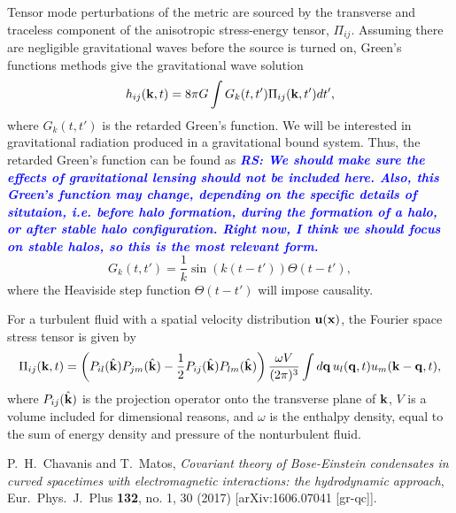 \documentclass[onecolumn,nofootinbib,superscriptaddress]{revtex4}
\newcommand{\rs}[1]{\textcolor{blue}{\it{\textbf{RS: #1}}} }
\begin{document}
{Tensor mode perturbations of the metric are sourced by the transverse and traceless component of the anisotropic stress-energy tensor, $\Pi_{ij}$. Assuming there are negligible gravitational waves before the source is turned on, Green's functions methods give the gravitational wave solution
\begin{equation}
h_{ij}({\bf{k}},t) = 8\pi G\int G_k(t,t')\Pi_{ij}({\bf{k}},t') dt',
\end{equation}
where $G_k(t,t')$ is the retarded Green's function.  We will be interested in gravitational radiation produced in a gravitational bound system.  Thus, the retarded Green's function can be found  as {\rs{We should make sure the effects of gravitational lensing should not be included here.  Also, this Green's function may change, depending on the specific details of situtaion, i.e. before halo formation, during the formation of a halo, or after stable halo configuration.  Right now, I think we should focus on stable halos, so this is the most relevant form.}}
\begin{equation}
G_k(t,t') = \frac{1}{k}\sin\left(k(t-t')\right)\Theta(t-t'),
\end{equation}
where the Heaviside step function $\Theta(t-t')$ will impose causality.

For a turbulent fluid with a spatial velocity distribution $\bf{u}(\bf{x})$, the Fourier space stress tensor is given \cite{Kosowsky:2001xp} by
\begin{equation}
\Pi_{ij}({\bf{k}},t) = \left(P_{il}(\hat{\bf{k}})P_{jm}(\hat{\bf{k}})-\frac{1}{2}P_{ij}(\hat{\bf{k}})P_{lm}(\hat{\bf{k}})\right)\frac{\omega V}{(2\pi)^3}\int d{\bf{q}} \,u_l({\bf{q}},t)u_m({\bf{k}}-{\bf{q}},t),
\end{equation}
where $P_{ij}(\hat{\bf{k}})$ is the projection operator onto the transverse plane of ${\bf{k}}$, $V$ is a volume included for dimensional reasons, and $\omega$ is the enthalpy density, equal to the sum of energy density and pressure of the nonturbulent fluid.









\begin{thebibliography}{99}

  P.~H.~Chavanis and T.~Matos,
  \emph{Covariant theory of Bose-Einstein condensates in curved spacetimes with electromagnetic interactions: the hydrodynamic approach},
  Eur.\ Phys.\ J.\ Plus {\bf 132}, no. 1, 30 (2017)
  [arXiv:1606.07041 [gr-qc]].


\end{thebibliography}}
\end{document}
